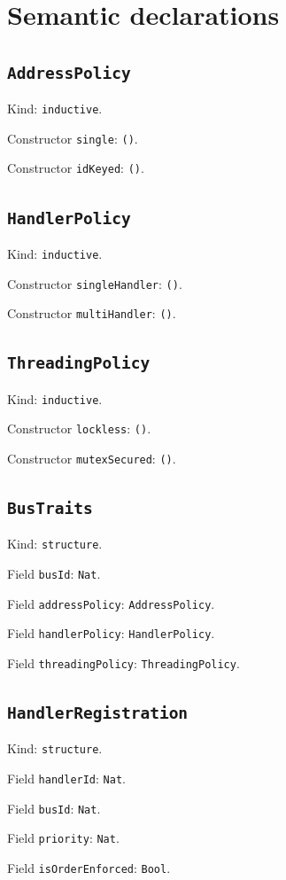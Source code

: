 \documentclass[11pt]{article}
\begin{document}
\section*{Semantic declarations}
\subsection*{\texttt{AddressPolicy}}
\noindent Kind: \texttt{inductive}.\par
\noindent Constructor \texttt{single}: \texttt{()}.\par
\noindent Constructor \texttt{idKeyed}: \texttt{()}.\par
\subsection*{\texttt{HandlerPolicy}}
\noindent Kind: \texttt{inductive}.\par
\noindent Constructor \texttt{singleHandler}: \texttt{()}.\par
\noindent Constructor \texttt{multiHandler}: \texttt{()}.\par
\subsection*{\texttt{ThreadingPolicy}}
\noindent Kind: \texttt{inductive}.\par
\noindent Constructor \texttt{lockless}: \texttt{()}.\par
\noindent Constructor \texttt{mutexSecured}: \texttt{()}.\par
\subsection*{\texttt{BusTraits}}
\noindent Kind: \texttt{structure}.\par
\noindent Field \texttt{busId}: \texttt{Nat}.\par
\noindent Field \texttt{addressPolicy}: \texttt{AddressPolicy}.\par
\noindent Field \texttt{handlerPolicy}: \texttt{HandlerPolicy}.\par
\noindent Field \texttt{threadingPolicy}: \texttt{ThreadingPolicy}.\par
\subsection*{\texttt{HandlerRegistration}}
\noindent Kind: \texttt{structure}.\par
\noindent Field \texttt{handlerId}: \texttt{Nat}.\par
\noindent Field \texttt{busId}: \texttt{Nat}.\par
\noindent Field \texttt{priority}: \texttt{Nat}.\par
\noindent Field \texttt{isOrderEnforced}: \texttt{Bool}.\par
\end{document}
